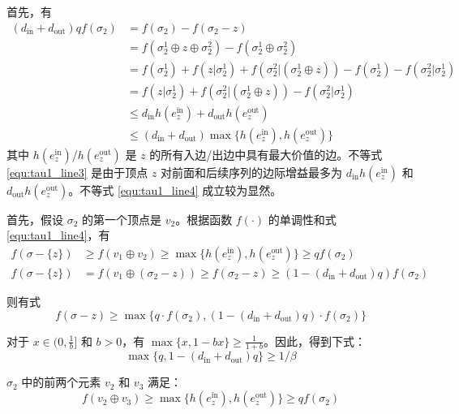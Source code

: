首先，有
\begin{align}
    (d_{\text{in}} +  d_{\text{out}}) q f(\sigma_2)&= f(\sigma_2) - f(\sigma_2-z) \\
    & = f(\sigma_2^1 \oplus z \oplus \sigma_2^2) - f(\sigma_2^1 \oplus \sigma_2^2) \\
    & = f(\sigma_2^1) + f(z|\sigma_2^1)+f(\sigma_2^2| (\sigma_2^1\oplus z)) - f(\sigma_2^1) -f(\sigma_2^2|\sigma_2^1) \\
    & = f(z|\sigma_2^1)+f(\sigma_2^2| (\sigma_2^1\oplus z)) - f(\sigma_2^2|\sigma_2^1) \\
    & \le d_{\text{in}} h(e_z^{\text{in}}) + d_{\text{out}} h(e_z^{\text{out}}) \label{equ:tau1_line3}\\
    & \le (d_{\text{in}} + d_{\text{out}}) \max \{h(e_z^{\text{in}}),h(e_z^{\text{out}})\} \label{equ:tau1_line4}
\end{align}
\noindent 其中 $h(e_z^{\text{in}})$/$h(e_z^{\text{out}})$ 是 $z$ 的所有入边/出边中具有最大价值的边。不等式 \ref{equ:tau1_line3} 是由于顶点 $z$ 对前面和后续序列的边际增益最多为 $d_{\text{in}} h(e_z^{\text{in}})$ 和 $d_{\text{out}} h(e_z^{\text{out}})$。不等式 \ref{equ:tau1_line4} 成立较为显然。

首先，假设 $\sigma_2$ 的第一个顶点是 $v_2$。根据函数 $f(\cdot)$ 的单调性和式 \ref{equ:tau1_line4}，有
\begin{align}
    f(\sigma-\{z\}) & \ge f(v_1 \oplus v_2) \ge \max \{h(e_z^{\text{in}}),h(e_z^{\text{out}})\} \ge q f(\sigma_2) \\
    f(\sigma-\{z\}) & = f(v_1 \oplus (\sigma_2-z)) \ge f(\sigma_2 -z) \ge (1-(d_{\text{in}} + d_{\text{out}})q) f(\sigma_2)
\end{align}

则有式
\begin{equation}
    f(\sigma-z)\ge \max\{ q \cdot f(\sigma_2),(1-(d_{\text{in}} + d_{\text{out}})q) \cdot f(\sigma_2)\} \label{equ:tau1_ine1}
\end{equation}

对于 $x\in (0,\frac{1}{b}]$ 和 $b>0$，有 $\max\{x,1-bx\} \ge \frac{1}{1+b}$。因此，得到下式：
\begin{equation}
    \max\{q,1-(d_{\text{in}} + d_{\text{out}})q\} \ge 1/\beta
\end{equation}

$\sigma_2$ 中的前两个元素 $v_2$ 和 $v_3$ 满足：
\begin{equation}
f(v_2\oplus v_3) \ge \max \{h(e_z^{\text{in}}),h(e_z^{\text{out}})\} \ge q f(\sigma_2) \label{equ:tau1_ine2}
\end{equation}

